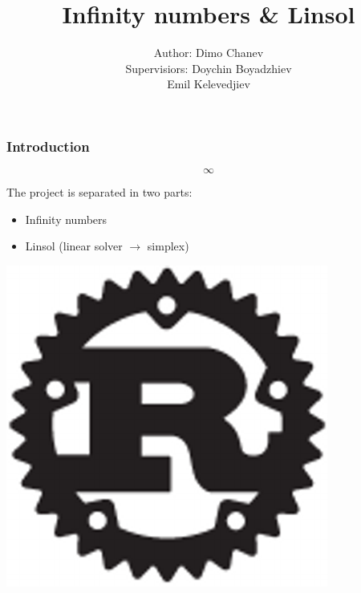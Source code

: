 \documentclass[12pt]{beamer}
\begin{document}
	
	\author[Dimo]{
		\begin{table}[]
			\begin{tabular}{rl}
				\normalsize{Author:    } & \normalsize{Dimo Chanev} \\
				\scriptsize{Supervisiors:     } & \scriptsize{Doychin Boyadzhiev} \\
												& \scriptsize{Emil Kelevedjiev}
			\end{tabular}
		\end{table}
	}
	\title[Infinity numbers \& Linsol]{\textbf{Infinity numbers \& Linsol}}
	
	\begin{frame}
		\titlepage
	\end{frame}

	\begin{frame}
		\frametitle{Introduction}
		\begin{center}
			\Huge{$$\infty$$}
		\end{center}
		\begin{block}{}
			The project is separated in two parts:
            \begin{itemize}
            \item Infinity numbers
            \item Linsol (linear solver $\to$ simplex)
            \end{itemize}
		\end{block}
		\vspace{0.1cm}
		\begin{center}
			\includegraphics[scale=0.1]{rust.png}
		\end{center}
		\vspace{1.1cm}
	\end{frame}
\end{document}
